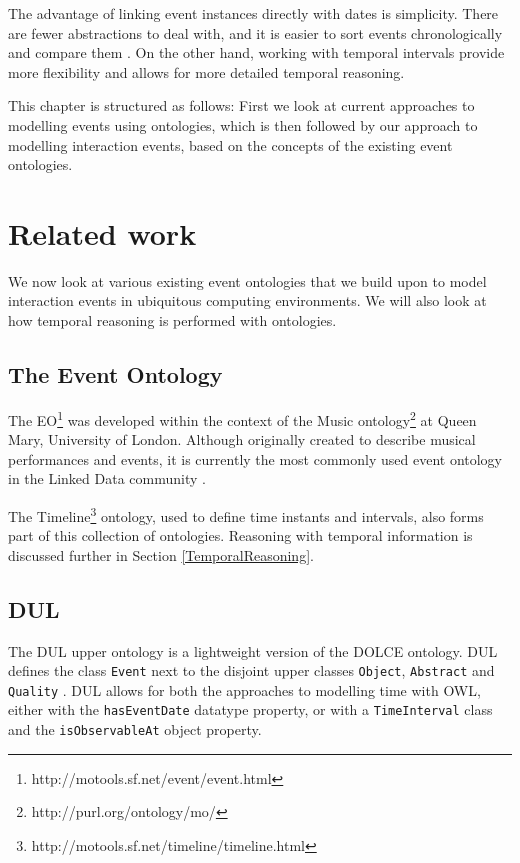 The advantage of linking event instances directly with dates is simplicity. There are fewer abstractions to deal with, and it is easier to sort events chronologically and compare them \cite{Shaw2009}. On the other hand, working with temporal intervals provide more flexibility and allows for more detailed temporal reasoning. 

This chapter is structured as follows: First we look at current approaches to modelling events using ontologies, which is then followed by our approach to modelling interaction events, based on the concepts of the existing event ontologies.

\section{Related work}
We now look at various existing event ontologies that we build upon to model interaction events in ubiquitous computing environments. We will also look at how temporal reasoning is performed with ontologies.

\subsection{The Event Ontology}
The \ac{EO}\footnote{http://motools.sf.net/event/event.html} was developed within the context of the Music ontology\footnote{http://purl.org/ontology/mo/} at Queen Mary, University of London. Although originally created to describe musical performances and events, it is currently the most commonly used event ontology in the Linked Data community \cite{Shaw2009}.

The Timeline\footnote{http://motools.sf.net/timeline/timeline.html} ontology, used to define time instants and intervals, also forms part of this collection of ontologies. Reasoning with temporal information is discussed further in Section \ref{TemporalReasoning}.  

\subsection{DUL}

The \ac{DUL} upper ontology is a light\-weight version of the \ac{DOLCE} ontology. \ac{DUL} defines the class \texttt{Event} next to the disjoint upper classes \texttt{Object}, \texttt{Abstract} and \texttt{Quality} \cite{Scherp2011}. \ac{DUL} allows for both the approaches to modelling time with \ac{OWL}, either with the \texttt{hasEventDate} datatype property, or with a \texttt{TimeInterval} class and the \texttt{isObservableAt} object property.

